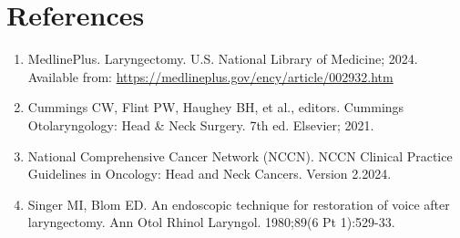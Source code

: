 \section*{References}
\begin{enumerate}
  \item MedlinePlus. Laryngectomy. U.S. National Library of Medicine; 2024. Available from: \url{https://medlineplus.gov/ency/article/002932.htm}
  \item Cummings CW, Flint PW, Haughey BH, et al., editors. Cummings Otolaryngology: Head \& Neck Surgery. 7th ed. Elsevier; 2021.
  \item National Comprehensive Cancer Network (NCCN). NCCN Clinical Practice Guidelines in Oncology: Head and Neck Cancers. Version 2.2024.
  \item Singer MI, Blom ED. An endoscopic technique for restoration of voice after laryngectomy. Ann Otol Rhinol Laryngol. 1980;89(6 Pt 1):529-33.
\end{enumerate}

\clearpage
